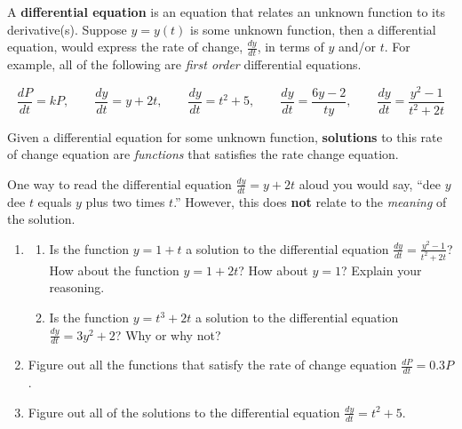 \clearpage
 

A {\bf differential equation} is an equation that relates an unknown function to its derivative(s). Suppose $y = y(t)$ is some unknown function, then a differential equation, would express the rate of change, $\frac{dy}{dt}$, in terms of $y$ and/or $t$. For example, all of the following are \textit{first order} differential equations.  

\[ \frac{dP}{dt}=kP,\qquad \frac{dy}{dt}=y+2t, \qquad \frac{dy}{dt}=t^2+5,\qquad \frac{dy}{dt}=\frac{6y-2}{ty}, \qquad \frac{dy}{dt}=\frac{y^2-1}{t^2+2t}
\]

 Given a differential equation for some unknown function, \textbf{solutions} to this rate of change equation are \textsl{functions} that satisfies the rate change equation. %
\vs

One way to read the differential equation $\frac{dy}{dt} = y+2t$ aloud you would say, ``dee $y$ dee $t$ equals $y$ plus two times $t$.'' However, this does \textbf{not} relate to the \textsl{meaning} of the solution. 

\begin{enumerate}[resume]
\item \begin{enumerate}
\item Is the function $y=1+t$  a solution to the differential equation $\displaystyle\frac{dy}{dt}=\frac{y^2-1}{t^2+2t}$? How about the function $y=1+2t$?  How about $y = 1$?  Explain your reasoning. \label{01problem4parta} \vfill 

\item	Is the function $y=t^3+2t$    a solution to the differential equation $\displaystyle \frac{dy}{dt}=3y^2+2$?  Why or why not? \label{01problem4partb} \vfill

\end{enumerate}

\item	Figure out all the functions that satisfy the rate of change equation $\displaystyle \frac{dP}{dt}=0.3P$. \vfill

\item	Figure out all of the solutions to the differential equation $\displaystyle\frac{dy}{dt}=t^2+5$. \label{01problem6} \vfill
\end{enumerate}

